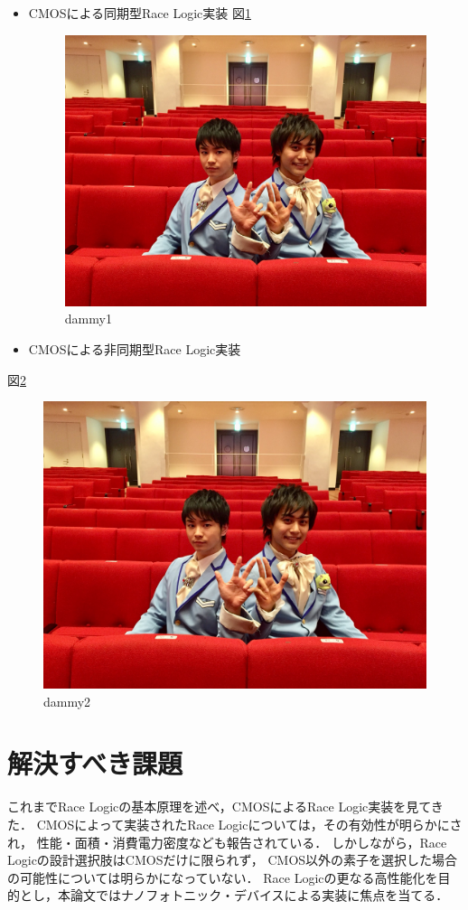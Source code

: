 \begin{itemize}
\item CMOSによる同期型Race Logic実装
図\ref{dammy1}
\begin{figure}[t!]
\begin{center}
\includegraphics[keepaspectratio,scale=0.01]{fig/dammy.jpg}
\caption{dammy1}
\label{dammy1}
\end{center}
\end{figure}

\item CMOSによる非同期型Race Logic実装
\end{itemize}
図\ref{dammy2}
\begin{figure}[t!]
\begin{center}
\includegraphics[keepaspectratio,scale=0.01]{fig/dammy.jpg}
\caption{dammy2}
\label{dammy2}
\end{center}
\end{figure}

\section{解決すべき課題}
これまでRace Logicの基本原理を述べ，CMOSによるRace Logic実装を見てきた．
CMOSによって実装されたRace Logicについては，その有効性が明らかにされ，
性能・面積・消費電力密度なども報告されている．
しかしながら，Race Logicの設計選択肢はCMOSだけに限られず，
CMOS以外の素子を選択した場合の可能性については明らかになっていない．
Race Logicの更なる高性能化を目的とし，本論文ではナノフォトニック・デバイスによる実装に焦点を当てる．
